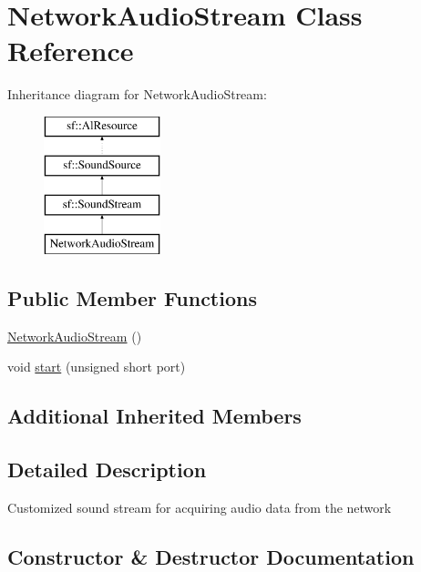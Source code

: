 \hypertarget{class_network_audio_stream}{}\section{Network\+Audio\+Stream Class Reference}
\label{class_network_audio_stream}
Inheritance diagram for Network\+Audio\+Stream\+:\begin{figure}[H]
\begin{center}
\leavevmode
\includegraphics[height=4.000000cm]{class_network_audio_stream}
\end{center}
\end{figure}
\subsection*{Public Member Functions}
\begin{DoxyCompactItemize}
\item 
\hyperlink{class_network_audio_stream_a16b7eba2911135401c404d67035206a8}{Network\+Audio\+Stream} ()
\item 
void \hyperlink{class_network_audio_stream_a5c698fc66d35fe30ae5e0148c03766e3}{start} (unsigned short port)
\end{DoxyCompactItemize}
\subsection*{Additional Inherited Members}


\subsection{Detailed Description}
Customized sound stream for acquiring audio data from the network 

\subsection{Constructor \& Destructor Documentation}
\mbox{\label{class_network_audio_stream_a16b7eba2911135401c404d67035206a8}} 
